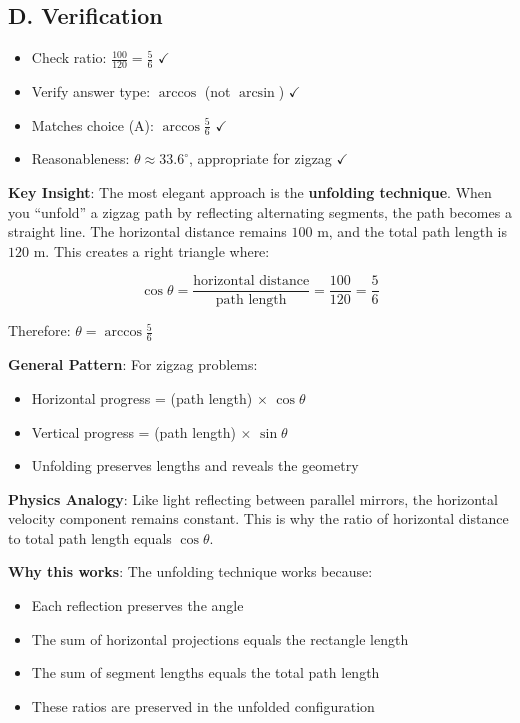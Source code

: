 \documentclass[11pt]{article}
\begin{document}
\begin{solutionbox}
\subsection*{D. Verification}
\begin{itemize}[leftmargin=*]
    \item Check ratio: $\frac{100}{120} = \frac{5}{6}$ $\checkmark$
    \item Verify answer type: $\arccos$ (not $\arcsin$) $\checkmark$
    \item Matches choice (A): $\arccos\frac{5}{6}$ $\checkmark$
    \item Reasonableness: $\theta \approx 33.6^\circ$, appropriate for zigzag $\checkmark$
\end{itemize}
\end{solutionbox}

\begin{keyinsightbox}
\textbf{Key Insight}: The most elegant approach is the \textbf{unfolding technique}. When you ``unfold'' a zigzag path by reflecting alternating segments, the path becomes a straight line. The horizontal distance remains $100$ m, and the total path length is $120$ m. This creates a right triangle where:

\[\cos\theta = \frac{\text{horizontal distance}}{\text{path length}} = \frac{100}{120} = \frac{5}{6}\]

Therefore: $\theta = \arccos\frac{5}{6}$

\textbf{General Pattern}: For zigzag problems:
\begin{itemize}
    \item Horizontal progress = (path length) $\times$ $\cos\theta$
    \item Vertical progress = (path length) $\times$ $\sin\theta$
    \item Unfolding preserves lengths and reveals the geometry
\end{itemize}

\textbf{Physics Analogy}: Like light reflecting between parallel mirrors, the horizontal velocity component remains constant. This is why the ratio of horizontal distance to total path length equals $\cos\theta$.

\textbf{Why this works}: The unfolding technique works because:
\begin{itemize}
    \item Each reflection preserves the angle
    \item The sum of horizontal projections equals the rectangle length
    \item The sum of segment lengths equals the total path length
    \item These ratios are preserved in the unfolded configuration
\end{itemize}
\end{keyinsightbox}
\end{document}
